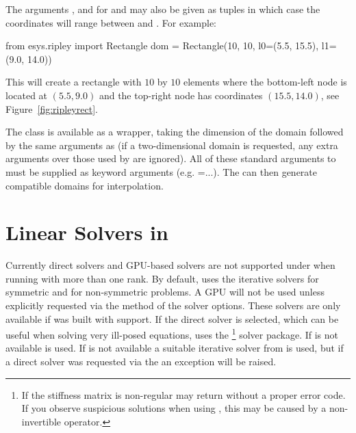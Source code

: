 \noindent The arguments ,  and  for 
and  may also be given as tuples  in which
case the coordinates will range between  and . For example:
\begin{python}
   from esys.ripley import Rectangle
   dom = Rectangle(10, 10, l0=(5.5, 15.5), l1=(9.0, 14.0))
\end{python}

\noindent This will create a rectangle with $10$ by $10$ elements where the
bottom-left node is located at $(5.5, 9.0)$ and the top-right node has
coordinates $(15.5, 14.0)$, see Figure~\ref{fig:ripleyrect}.

The  class is available as a wrapper, taking the
dimension of the domain followed by the same arguments as  (if
a two-dimensional domain is requested, any extra arguments over those used by
 are ignored). All of these standard arguments to
 must be supplied as keyword arguments
(e.g. =...). The  can then generate
compatible domains for interpolation.

\section{Linear Solvers in \SolverOptions}
Currently direct solvers and GPU-based solvers are not supported under \MPI
when running with more than one rank.
By default, \ripley uses the iterative solvers \PCG for symmetric and \BiCGStab
for non-symmetric problems.
A GPU will not be used unless explicitly requested via the
 method of the solver options.
These solvers are only available if \ripley was built with \CUDA support.
If the direct solver is selected, which can be useful when solving very
ill-posed equations, \ripley uses the \MKL\footnote{If the stiffness matrix is
non-regular \MKL may return without a proper error code. If you observe
suspicious solutions when using \MKL, this may be caused by a non-invertible
operator.} solver package. If \MKL is not available \UMFPACK is used.
If \UMFPACK is not available a suitable iterative solver from \PASO is used, but
if a direct solver was requested via the \SolverOptions an exception will be
raised.



